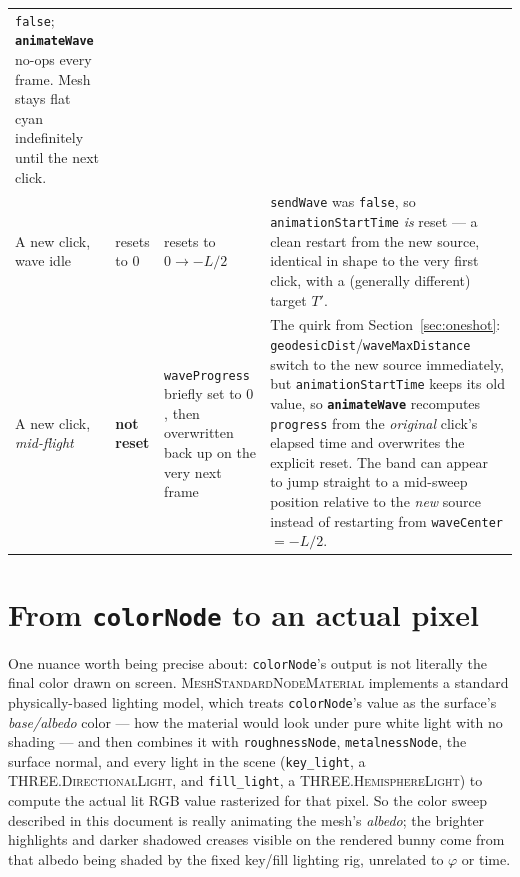 \documentclass[11pt]{article}
\newcommand{\code}[1]{\texttt{#1}}
\newcommand{\func}[1]{\texttt{\textbf{#1}}}
\newcommand{\type}[1]{\textsc{#1}}
\begin{document}
\begin{center}
\begin{tabular}{@{}p{2.5cm}p{1.7cm}p{3.0cm}p{6.1cm}@{}}
  \code{false}; \func{animateWave} no-ops every frame. Mesh stays flat cyan indefinitely
  until the next click. \\
A new click, wave idle & resets to $0$ & resets to $0 \to -L/2$ & \code{sendWave} was
  \code{false}, so \code{animationStartTime} \emph{is} reset --- a clean restart from the
  new source, identical in shape to the very first click, with a (generally different)
  target $T'$. \\
A new click, \emph{mid-flight} & \textbf{not reset} & \code{waveProgress} briefly set to
  $0$, then overwritten back up on the very next frame & The quirk from
  Section~\ref{sec:oneshot}: \code{geodesicDist}/\code{waveMaxDistance} switch to the new
  source immediately, but \code{animationStartTime} keeps its old value, so
  \func{animateWave} recomputes \code{progress} from the \emph{original} click's elapsed
  time and overwrites the explicit reset. The band can appear to jump straight to a
  mid-sweep position relative to the \emph{new} source instead of restarting from
  \code{waveCenter}$=-L/2$. \\
\bottomrule
\end{tabular}
\end{center}

\section{From \code{colorNode} to an actual pixel}
\label{sec:pbr}

One nuance worth being precise about: \code{colorNode}'s output is not literally the final
color drawn on screen. \type{MeshStandardNodeMaterial} implements a standard
physically-based lighting model, which treats \code{colorNode}'s value as the surface's
\emph{base/albedo} color --- how the material would look under pure white light with no
shading --- and then combines it with \code{roughnessNode}, \code{metalnessNode}, the
surface normal, and every light in the scene (\code{key\_light}, a
\type{THREE.DirectionalLight}, and \code{fill\_light}, a \type{THREE.HemisphereLight}) to
compute the actual lit RGB value rasterized for that pixel. So the color sweep described in
this document is really animating the mesh's \emph{albedo}; the brighter highlights and
darker shadowed creases visible on the rendered bunny come from that albedo being shaded by
the fixed key/fill lighting rig, unrelated to $\varphi$ or time.
\end{document}
